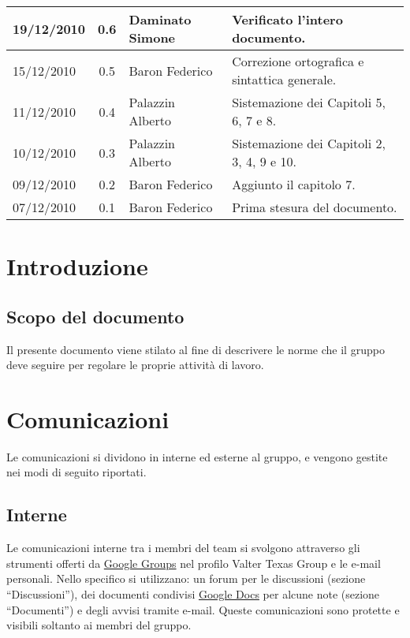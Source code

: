 \begin{longtable}{|p{}|c|p{}|p{}|}
\hline
19/12/2010 & 0.6 & Daminato Simone & Verificato l'intero documento.\\
\hline
15/12/2010 & 0.5 & Baron Federico & Correzione ortografica e sintattica
generale.\\
\hline
11/12/2010 & 0.4 & Palazzin Alberto & Sistemazione dei Capitoli 5, 6, 7 e 8.\\
\hline
10/12/2010 & 0.3 & Palazzin Alberto & Sistemazione dei Capitoli 2, 3, 4, 9 e
10.\\
\hline
09/12/2010 & 0.2 & Baron Federico & Aggiunto il capitolo 7.\\
\hline
 07/12/2010 & 0.1 & Baron Federico & Prima stesura del documento.
\end{longtable}


\tableofcontents

\chapter{Introduzione}
\thispagestyle{fancy} %

\section{Scopo del documento}
Il presente documento viene stilato al fine di descrivere le norme che il gruppo
deve seguire per regolare le proprie attivit\`a di lavoro.



\chapter{Comunicazioni}
\thispagestyle{fancy}
Le comunicazioni si dividono in interne ed esterne al gruppo, e vengono gestite
nei modi di seguito riportati.

\section{Interne}
Le comunicazioni interne tra i membri del team si svolgono attraverso gli
strumenti offerti da \underline{Google Groups} nel profilo Valter Texas Group e
le e-mail personali. Nello specifico si utilizzano: un forum per le discussioni
(sezione ``Discussioni''), dei documenti condivisi \underline{Google Docs} per
alcune note (sezione ``Documenti'') e degli avvisi tramite e-mail. 
Queste comunicazioni sono protette e visibili soltanto ai membri del gruppo.


